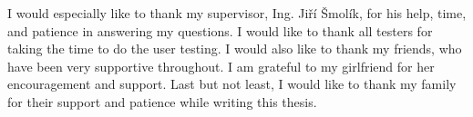 \documentclass[english,master,unicode]{ctufit-thesis}
\begin{document}
    \frontmatter\frontmatterinit %


    \thispagestyle{empty}\cleardoublepage\maketitle %

    \imprintpage %

    \tableofcontents %
    \listoffigures %
    \begingroup
    \let\clearpage\relax
    \listoftables %
    \thectufitlistingscommand
    \endgroup

    \begin{acknowledgmentpage}
        I would especially like to thank my supervisor, Ing. Jiří Šmolík, for his help, time, and patience in answering my
        questions. 
        I would like to thank all testers for taking the time to do the user testing. 
        I would also like to thank my friends,
        who have been very supportive throughout.
        I am grateful to my girlfriend for her encouragement and support.
        Last but not least, I
        would like to thank my family for their support and patience while writing this thesis.
    \end{acknowledgmentpage}
\end{document}
